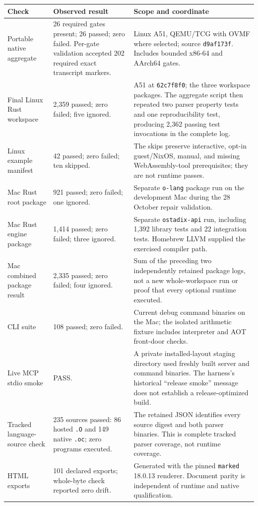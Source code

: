 \documentclass[11pt,oneside]{article}
\begin{document}
\begin{longtable}{P{0.23\textwidth} P{0.33\textwidth} P{0.36\textwidth}}
\toprule
\textbf{Check} & \textbf{Observed result} & \textbf{Scope and coordinate} \\
\midrule
\endhead
Portable native aggregate & 26 required gates present; 26 passed; zero
failed. Per-gate validation accepted 202 required exact transcript markers. &
Linux A51, QEMU/TCG with OVMF where selected; source \texttt{d9af173f}.
Includes bounded x86-64 and AArch64 gates. \\
Final Linux Rust workspace & 2,359 passed; zero failed; five ignored. &
A51 at \texttt{62c7f8f0}; the three workspace packages. The aggregate script
then repeated two parser property tests and one reproducibility test,
producing 2,362 passing test invocations in the complete log. \\
Linux example manifest & 42 passed; zero failed; ten skipped. &
The skips preserve interactive, opt-in guest/NixOS, manual, and missing
WebAssembly-tool prerequisites; they are not runtime passes. \\
Mac Rust root package & 921 passed; zero failed; one ignored. &
Separate \texttt{o-lang} package run on the development Mac during the
28 October repair validation. \\
Mac Rust engine package & 1,414 passed; zero failed; three ignored. &
Separate \texttt{ostadix-api} run, including 1,392 library tests and 22
integration tests. Homebrew LLVM supplied the exercised compiler path. \\
Mac combined package result & 2,335 passed; zero failed; four ignored. &
Sum of the preceding two independently retained package logs, not a new
whole-workspace run or proof that every optional runtime executed. \\
CLI suite & 108 passed; zero failed. &
Current debug command binaries on the Mac; the isolated arithmetic fixture
includes interpreter and AOT front-door checks. \\
Live MCP stdio smoke & PASS. &
A private installed-layout staging directory used freshly built server and
command binaries. The harness's historical ``release smoke'' message does
not establish a release-optimized build. \\
Tracked language-source check & 235 sources passed: 86 hosted \texttt{.O}
and 149 native \texttt{.oc}; zero programs executed. &
The retained JSON identifies every source digest and both parser binaries.
This is complete tracked parser coverage, not runtime coverage. \\
HTML exports & 101 declared exports; whole-byte check reported zero drift. &
Generated with the pinned \texttt{marked} 18.0.13 renderer. Document parity
is independent of runtime and native qualification. \\
\bottomrule
\end{longtable}
\end{document}
